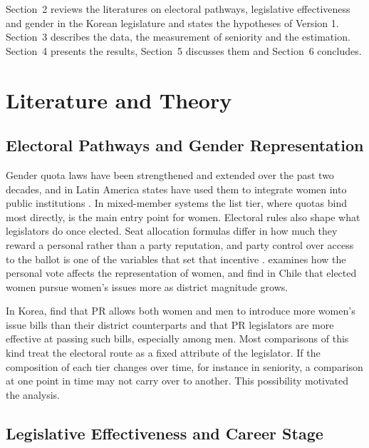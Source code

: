 \documentclass[11pt]{article}
\begin{document}
Section~2 reviews the literatures on electoral pathways, legislative effectiveness and gender in the Korean legislature and states the hypotheses of Version 1. Section~3 describes the data, the measurement of seniority and the estimation. Section~4 presents the results, Section~5 discusses them and Section~6 concludes.


\section{Literature and Theory}

\subsection{Electoral Pathways and Gender Representation}

Gender quota laws have been strengthened and extended over the past two decades, and in Latin America states have used them to integrate women into public institutions \citep{piscopo2015}. In mixed-member systems the list tier, where quotas bind most directly, is the main entry point for women. Electoral rules also shape what legislators do once elected. Seat allocation formulas differ in how much they reward a personal rather than a party reputation, and party control over access to the ballot is one of the variables that set that incentive \citep{carey1995}. \citet{valdini2013} examines how the personal vote affects the representation of women, and \citet{crisp2022} find in Chile that elected women pursue women's issues more as district magnitude grows.

In Korea, \citet{kweon2021} find that PR allows both women and men to introduce more women's issue bills than their district counterparts and that PR legislators are more effective at passing such bills, especially among men. Most comparisons of this kind treat the electoral route as a fixed attribute of the legislator. If the composition of each tier changes over time, for instance in seniority, a comparison at one point in time may not carry over to another. This possibility motivated the analysis.

\subsection{Legislative Effectiveness and Career Stage}
\end{document}
